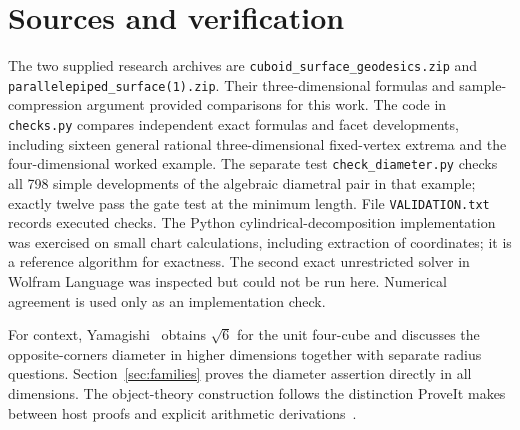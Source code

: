 \documentclass[10pt,letterpaper]{article}
\begin{document}
\section*{Sources and verification}
The two supplied research archives are \texttt{cuboid\_surface\_geodesics.zip} and \texttt{parallelepiped\_surface(1).zip}. Their three-dimensional formulas and sample-compression argument provided comparisons for this work. The code in \texttt{checks.py} compares independent exact formulas and facet developments, including sixteen general rational three-dimensional fixed-vertex extrema and the four-dimensional worked example. The separate test \texttt{check\_diameter.py} checks all 798 simple developments of the algebraic diametral pair in that example; exactly twelve pass the gate test at the minimum length. File \texttt{VALIDATION.txt} records executed checks. The Python cylindrical-decomposition implementation was exercised on small chart calculations, including extraction of coordinates; it is a reference algorithm for exactness. The second exact unrestricted solver in Wolfram Language was inspected but could not be run here. Numerical agreement is used only as an implementation check.
\par For context, Yamagishi~\cite{yam} obtains $\sqrt{6}$ for the unit four-cube and discusses the opposite-corners diameter in higher dimensions together with separate radius questions. Section~\ref{sec:families} proves the diameter assertion directly in all dimensions. The object-theory construction follows the distinction ProveIt makes between host proofs and explicit arithmetic derivations~\cite{ipra}.
\end{document}
